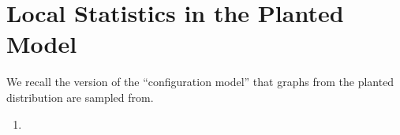 \section{Local Statistics in the Planted Model}
We recall the version of the ``configuration model'' that graphs from the planted distribution are sampled from.
\begin{enumerate}
    \item 
\end{enumerate}